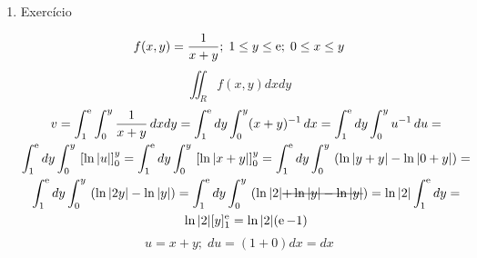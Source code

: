 \begin{enumerate}
	\item Exercício
	
	\begin{equation*}
		f(x,y) = \dfrac{1}{x + y};\; 1 \leq y \leq \operatorname{e};\; 0 \leq x \leq y	
	\end{equation*}
	\begin{equation*}
		\iint_R f(x, y) dx dy
	\end{equation*}
	\begin{gather*}
		v = \int_1^{\e} \int_0^y \dfrac{1}{x + y}\, dx dy = \int_1^{\e} dy \int_0^y (x + y)^{-1}\, dx = \int_1^{\e} dy \int_0^y u^{-1}\, du =\\ \int_1^{\e} dy \int_0^y\, \left[\ln |u|\right]_0^y = \int_1^{\e} dy \int_0^y\, \left[\ln |x + y|\right]_0^y = \int_1^{\e} dy \int_0^y\, \left(\ln |y + y| - \ln |0 + y|\right) =\\ \int_1^{\e} dy \int_0^y\, \left(\ln |2y| - \ln |y|\right) = \int_1^{\e} dy \int_0^y\, \left(\ln |2| \overstrike{+ \ln |y| - \ln |y|}\right) = \ln |2|\int_1^{\e} dy =\\ \ln |2|[y]_1^{\e} = \ln |2|(\e - 1)
	\end{gather*}
	\begin{equation*}
		u = x + y;\; du = (1 + 0)dx = dx
	\end{equation*}
\end{enumerate}